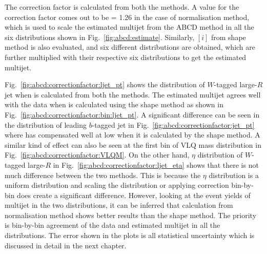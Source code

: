 The correction factor is calculated from both the methods. A value for the correction factor comes out to be \R = 1.26 in the case of normalisation method, which is used to scale the estimated multijet from the ABCD method in all the six distributions shown in Fig.\ \ref{fig:abcd:estimate}. Similarly, \R$[i]$ from shape method is also evaluated, and six different distributions are obtained, which are further multiplied with their respective six distributions to get the estimated multijet. 

Fig.\ \ref{fig:abcd:correctionfactor:ljet_pt} shows the \pt distribution of $W$-tagged large-$R$ jet when \R is calculated from both the methods. The estimated multijet agrees well with the data when \R is calculated using the shape method as shown in Fig.\ \ref{fig:abcd:correctionfactor:bin:ljet_pt}. A significant difference can be seen in the \pt distribution of leading $b$-tagged jet in Fig.\ \ref{fig:abcd:correctionfactor:jet_pt} where \R has compensated well at low \pt when it is calculated by the shape method. A similar kind of effect can also be seen at the first bin of VLQ mass distribution in Fig.\ \ref{fig:abcd:correctionfactor:VLQM}. On the other hand, $\eta$ distribution of $W$-tagged large-$R$ in Fig.\ \ref{fig:abcd:correctionfactor:ljet_eta} shows that there is not much difference between the two methods. This is because the $\eta$ distribution is a uniform distribution and scaling the distribution or applying correction bin-by-bin does create a significant difference. However, looking at the event yields of multijet in the two distributions, it can be inferred that calculation from normalisation method shows better results than the shape method. The priority is bin-by-bin agreement of the data and estimated multijet in all the distributions. The error shown in the plots is all statistical uncertainty which is discussed in detail in the next chapter.


